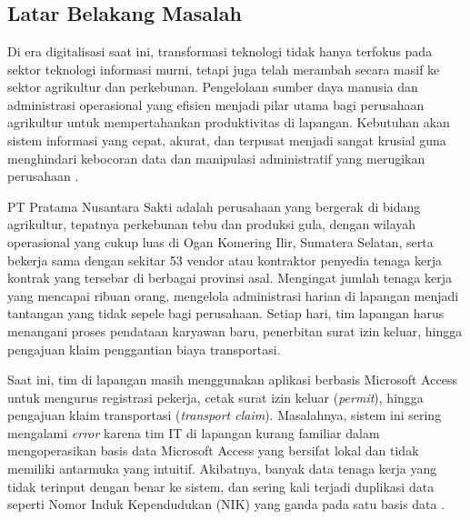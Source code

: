  
\chapter{\babSatu}
 
\section{Latar Belakang Masalah}
 
Di era digitalisasi saat ini, transformasi teknologi tidak hanya terfokus pada
sektor teknologi informasi murni, tetapi juga telah merambah secara masif ke
sektor agrikultur dan perkebunan. Pengelolaan sumber daya manusia dan
administrasi operasional yang efisien menjadi pilar utama bagi perusahaan
agrikultur untuk mempertahankan produktivitas di lapangan. Kebutuhan akan sistem
informasi yang cepat, akurat, dan terpusat menjadi sangat krusial guna
menghindari kebocoran data dan manipulasi administratif yang merugikan perusahaan
\cite{almansouri2024hris}.
 
PT Pratama Nusantara Sakti adalah perusahaan yang bergerak di bidang agrikultur,
tepatnya perkebunan tebu dan produksi gula, dengan wilayah operasional yang cukup
luas di Ogan Komering Ilir, Sumatera Selatan, serta bekerja sama dengan sekitar
53 vendor atau kontraktor penyedia tenaga kerja kontrak yang tersebar di
berbagai provinsi asal. Mengingat jumlah tenaga kerja yang mencapai ribuan
orang, mengelola administrasi harian di lapangan menjadi tantangan yang tidak
sepele bagi perusahaan. Setiap hari, tim lapangan harus menangani proses
pendataan karyawan baru, penerbitan surat izin keluar, hingga pengajuan klaim
penggantian biaya transportasi.
 
Saat ini, tim di lapangan masih menggunakan aplikasi berbasis Microsoft Access
untuk mengurus registrasi pekerja, cetak surat izin keluar (\textit{permit}),
hingga pengajuan klaim transportasi (\textit{transport claim}). Masalahnya,
sistem ini sering mengalami \textit{error} karena tim IT di lapangan kurang
familiar dalam mengoperasikan basis data Microsoft Access yang bersifat lokal dan
tidak memiliki antarmuka yang intuitif. Akibatnya, banyak data tenaga kerja yang
tidak terinput dengan benar ke sistem, dan sering kali terjadi duplikasi data
seperti Nomor Induk Kependudukan (NIK) yang ganda pada satu basis data
\cite{ravikanth2024deduplication}.
 
